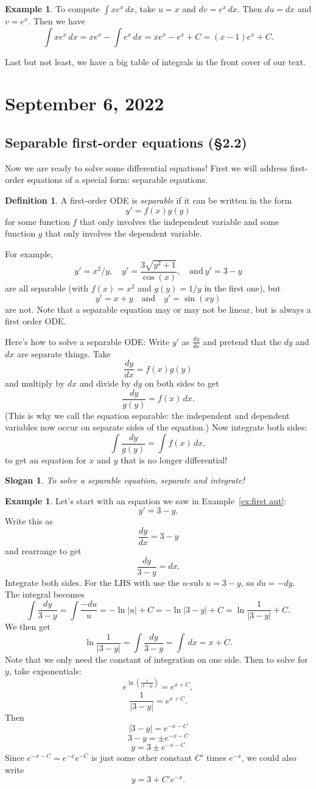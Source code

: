\documentclass[12pt]{amsart}
\numberwithin{equation}{section}
\theoremstyle{plain} %
\newtheorem{slogan}[equation]{Slogan}
\newcommand{\Sept}[1]{\section{September #1, 2022}}
\theoremstyle{definition}
\newtheorem{defn}[equation]{Definition}
\newtheorem{ex}[equation]{Example}
\theoremstyle{remark}
\begin{document}
\begin{ex}
To compute $\int x e^x \, dx$, take $u=x$ and $dv= e^x \, dx$. Then $du = dx$ and $v=e^x$. Then we have \[\int x e^x \, dx = x e^x - \int e^x \, dx = x e^x - e^x +C = (x-1) e^x +C.\]
\end{ex}

Last but not least, we have a big table of integrals in the front cover of our text. 


\Sept{6}

\subsection*{Separable first-order equations (\S2.2)} Now we are ready to solve some differential equations! First we will address first-order equations of a special form: separable eqautions.

\begin{defn} A first-order ODE is \emph{separable} if it can be written in the form
\[ y' = f(x) g(y)\]
for some function $f$ that only involves the independent variable and some function $g$ that only involves the dependent variable.
\end{defn}

For example,
\[ y' = x^2/y, \quad y' = \frac{3 \sqrt{y^2+1}}{\cos(x)}, \quad \text{and} \ y' = 3-y \]
are all separable (with $f(x)=x^2$ and $g(y)=1/y$ in the first one), but
\[ y' = x+y \quad \text{and} \quad y'=\sin(xy) \]
are not. Note that a separable equation may or may not be linear, but is always a first order ODE.

Here's how to solve a separable ODE: Write $y'$ as $\frac{dy}{dx}$ and pretend that the $dy$ and $dx$ are separate things. Take
\[ \frac{dy}{dx} = f(x)g(y)\]
and multiply by $dx$ and divide by $dy$ on both sides to get
\[ \frac{dy}{g(y)} = f(x) \, dx.\]
(This is why we call the equation separable: the independent and dependent variables now occur on separate sides of the equation.) Now integrate both sides:
\[ \int \frac{dy}{g(y)} = \int f(x) \, dx,\]
to get an equation for $x$ and $y$ that is no longer differential!

\begin{slogan} To solve a separable equation, separate and integrate!\end{slogan}

\begin{ex} Let's start with an equation we saw in Example~\ref{ex:first aut}:
\[ y' = 3-y.\]
Write this as 
\[ \frac{dy}{dx} = 3-y\]
and rearrange to get
\[ \frac{dy}{3-y} = dx.\]
Integrate both sides. For the LHS with use the $u$-sub $u=3-y$, so $du = - dy$. The integral becomes
\[ \int  \frac{dy}{3-y} = \int \frac{-du}{u} = -\ln|u| +C = -\ln|3-y|+C = \ln\frac{1}{|3-y|} +C.\]
We then get 
\[ \ln\frac{1}{|3-y|}  = \int  \frac{dy}{3-y} =\int \,dx = x + C.\]
Note that we only need the constant of integration on one side.
Then to solve for $y$, take exponentials:
\[ e^{\ln(\frac{1}{|3-y|})} = e^{x+C},\]
\[ \frac{1}{|3-y|} = e^{x+C}.\]
Then 
\[ |3-y| ={e^{-x-C}}\]
\[ 3-y =  \pm {e^{-x-C}}\]
\[ y =  3 \pm {e^{-x-C}}\]
Since $e^{-x-C}=e^{-x} e^{-C}$ is just some other constant $C'$ times $e^{-x}$, we could also write
\[ y= 3 + C' e^{-x}.\]
\end{ex}
\end{document}

